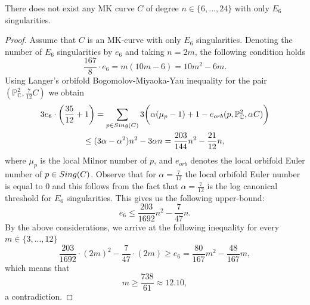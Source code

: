 \documentclass[10pt,a4paper]{amsart}
\begin{document}
\begin{theorem}
\label{thmE6}
There does not exist any MK curve $C$ of degree $n \in \{6,...,24\}$ with only $E_{6}$ singularities.
\end{theorem}

\begin{proof}
Assume that $C$ is an MK-curve with only $E_{6}$ singularities.  Denoting the number of $E_{6}$ singularities by $e_{6}$ and taking $n=2m$, the following condition holds 
\begin{equation}
\frac{167}{8}\cdot e_{6}=m(10m-6) = 10m^{2}-6m.
\end{equation}
Using Langer's orbifold Bogomolov-Miyaoka-Yau inequality for the pair $(\mathbb{P}^{2}_{\mathbb{C}},\frac{7}{12}C)$ we obtain
\begin{gather*}
3e_{6}\cdot \bigg(\frac{35}{12}+1\bigg) = \sum_{p \in {\rm Sing}(C)}3\bigg(\alpha(\mu_{p}-1)+1 - e_{orb}(p, \mathbb{P}^{2}_{\mathbb{C}},\alpha C)\bigg) \\ \leq (3\alpha - \alpha^{2})n^{2} - 3\alpha n = \frac{203}{144}n^2 - \frac{21}{12}n,
\end{gather*}
where $\mu_{p}$ is the local Milnor number of $p$, and $e_{orb}$ denotes the local orbifold Euler number of $p \in {\rm Sing}(C)$. Observe that for $\alpha =\frac{7}{12}$ the local orbifold Euler number is equal to $0$ and this follows from the fact that $\alpha=\frac{7}{12}$ is the log canonical threshold for $E_{6}$ singularities. This gives us the following upper-bound:
\begin{equation}
e_{6}\leq \frac{203}{1692}n^{2}-\frac{7}{47}n.
\end{equation}
By the above considerations, we arrive at the following inequality for every $m\in \{3, ..., 12\}$
\begin{equation}
\frac{203}{1692}\cdot(2m)^{2}-\frac{7}{47}\cdot(2m) \geq e_{6} = \frac{80}{167}m^{2}-\frac{48}{167}m,
\end{equation}
which means that 
$$m\geq \frac{738}{61}\approx 12.10,$$
a contradiction.
\end{proof}
\end{document}
